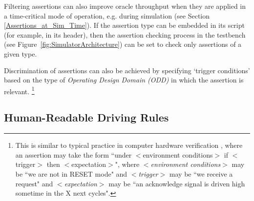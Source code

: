 Filtering assertions can also improve %
oracle throughput %
when they are applied in a time-critical mode of operation, e.g. during simulation (see Section \ref{Assertions_at_Sim_Time}). If the assertion type can be embedded in its script (for example, in its header), then the assertion checking process in the testbench (see Figure~\ref{fig:SimulatorArchitecture}) can be set to check only assertions of a given type.

Discrimination %
of assertions can also be achieved by specifying `trigger conditions' based on the type of \textit{Operating Design Domain (ODD)} in which the assertion is relevant.
\footnote{This is similar to typical practice in computer hardware verification \cite{tao2009}, where an assertion may take the form ``under $<$environment conditions$>$ if $<$trigger$>$ then $<$expectation$>$", where \textit{$<$environment conditions$>$} may be ``we are not in RESET mode" and \textit{$<$trigger$>$} may be ``we receive a request" and \textit{$<$expectation$>$}  may be ``an acknowledge signal is driven high sometime in the X next cycles".} 


\subsection{Human-Readable Driving Rules}
\label{interp_nat_lang_UKHC_rules}%

